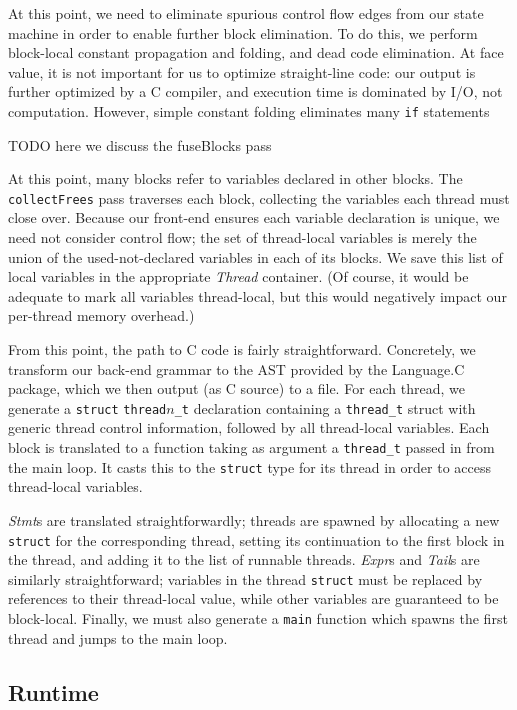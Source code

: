 \documentclass[preprint]{sigplanconf}
\renewcommand{\t}{\texttt}
\renewcommand{\i}{\textit}
\begin{document}
At this point, we need to eliminate spurious control flow edges from our state
machine in order to enable further block elimination. To do this, we perform
block-local constant propagation and folding, and dead code elimination. At face
value, it is not important for us to optimize straight-line code: our output is
further optimized by a C compiler, and execution time is dominated by I/O, not
computation. However, simple constant folding eliminates many \t{if} statements

TODO here we discuss the fuseBlocks pass

At this point, many blocks refer to variables declared in other blocks. The
\t{collectFrees} pass traverses each block, collecting the variables each thread
must close over. Because our front-end ensures each variable declaration is
unique, we need not consider control flow; the set of thread-local variables is
merely the union of the used-not-declared variables in each of its blocks.  We
save this list of local variables in the appropriate \i{Thread} container. (Of
course, it would be adequate to mark all variables thread-local, but this would
negatively impact our per-thread memory overhead.)

From this point, the path to C code is fairly straightforward. Concretely, we
transform our back-end grammar to the AST provided by the Language.C package,
which we then output (as C source) to a file. For each thread, we generate a
\t{struct} \t{thread$n$\_t} declaration containing a \t{thread\_t} struct with
generic thread control information, followed by all thread-local variables. Each
block is translated to a function taking as argument a \t{thread\_t} passed in
from the main loop. It casts this to the \t{struct} type for its thread in order
to access thread-local variables.

\i{Stmt}s are translated straightforwardly; threads are spawned by allocating a
new \t{struct} for the corresponding thread, setting its continuation to the
first block in the thread, and adding it to the list of runnable threads.
\i{Expr}s and \i{Tail}s are similarly straightforward; variables in the thread
\t{struct} must be replaced by references to their thread-local value, while
other variables are guaranteed to be block-local. Finally, we must also generate
a \t{main} function which spawns the first thread and jumps to the main loop.
  
\subsection{Runtime}
\end{document}
